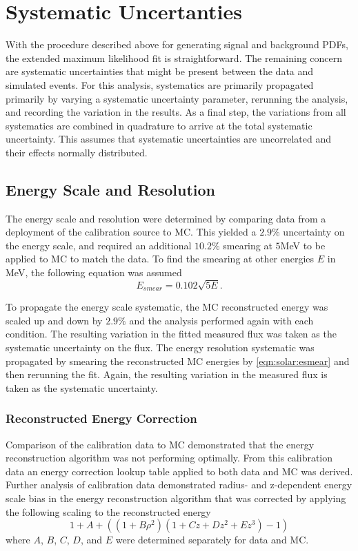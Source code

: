 \section{Systematic Uncertanties}

With the procedure described above for generating signal and background PDFs, the extended maximum likelihood fit is straightforward.
The remaining concern are systematic uncertainties that might be present between the data and simulated events.
For this analysis, systematics are primarily propagated primarily by varying a systematic uncertainty parameter, rerunning the analysis, and recording the variation in the results.
As a final step, the variations from all systematics are combined in quadrature to arrive at the total systematic uncertainty.
This assumes that systematic uncertainties are uncorrelated and their effects normally distributed.

\subsection{Energy Scale and Resolution}

The energy scale and resolution were determined by comparing data from a deployment of the \N calibration source to MC. 
This yielded a $2.9\%$ uncertainty on the energy scale, and required an additional $10.2\%$ smearing at $5$MeV to be applied to MC to match the data.
To find the smearing at other energies $E$ in MeV, the following equation was assumed
\begin{equation}
\label{eqn:solar:esmear}
E_{smear} = 0.102\sqrt{5 E}.
\end{equation}

To propagate the energy scale systematic, the MC reconstructed energy was scaled up and down by $2.9\%$ and the analysis performed again with each condition.
The resulting variation in the fitted measured flux was taken as the systematic uncertainty on the flux.
The energy resolution systematic was propagated by smearing the reconstructed MC energies by \ref{eqn:solar:esmear} and then rerunning the fit.
Again, the resulting variation in the measured flux is taken as the systematic uncertainty.

\subsubsection{Reconstructed Energy Correction}

Comparison of the \N calibration data to MC demonstrated that the energy reconstruction algorithm was not performing optimally.
From this calibration data an energy correction lookup table applied to both data and MC was derived.
Further analysis of \N calibration data demonstrated radius- and z-dependent energy scale bias in the energy reconstruction algorithm that was corrected by applying the following scaling to the reconstructed energy
\begin{equation}
1 + A + ( (1 + B \rho^2)(1 + Cz + Dz^2 + Ez^3) - 1 )
\end{equation}
where $A$, $B$, $C$, $D$, and $E$ were determined separately for data and MC.

